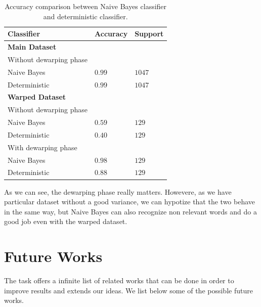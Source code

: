 \documentclass[10pt,twocolumn,letterpaper]{article}
\begin{document}
\begin{table}[!h]
  \begin{center}
    \begin{tabular}{lll}
      \hline
      Classifier              & Accuracy & Support \\ \hline
      \textbf{Main Dataset}                        \\
      \small Without dewarping phase               \\
      \; \; Naive Bayes       & $0.99$   & $1047$  \\
      \; \; Deterministic     & $0.99$   & $1047$  \\ \hline

      \textbf{Warped Dataset} &          &         \\
      \small Without dewarping phase               \\
      \; \; Naive Bayes       & $0.59$   & $129$   \\
      \; \; Deterministic     & $0.40$   & $129$   \\

      \small With dewarping phase                  \\
      \; \; Naive Bayes       & $0.98$   & $129$   \\
      \; \; Deterministic     & $0.88$   & $129$   \\ \hline
    \end{tabular}
  \end{center}
  \label{table:classifiers-comparison}
  \caption{Accuracy comparison between Naive Bayes classifier and
    deterministic classifier.}
\end{table}

As we can see, the dewarping phase really matters. Howevere, as we
have particular dataset without a good variance, we can hypotize that
the two behave in the same way, but Naive Bayes can also recognize non
relevant words and do a good job even with the warped dataset.

\section{Future Works}
\label{sec:future-works}

The task offers a infinite list of related works that can be done in
order to improve results and extends our ideas. We list below some of
the possible future works.
\end{document}
